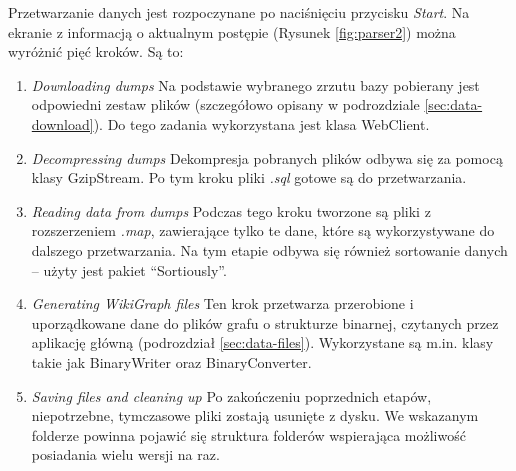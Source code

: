 Przetwarzanie danych jest rozpoczynane po naciśnięciu przycisku \textit{Start}. Na ekranie z informacją o aktualnym postępie (Rysunek \ref{fig:parser2}) można wyróżnić pięć kroków. Są to:

\begin{enumerate}[label=\textbullet]
    \item \textit{Downloading dumps} \linebreak
    Na podstawie wybranego zrzutu bazy pobierany jest odpowiedni zestaw plików (szczegółowo opisany w podrozdziale \ref{sec:data-download}). Do tego zadania wykorzystana jest klasa WebClient.
    \item \textit{Decompressing dumps} \linebreak
    Dekompresja pobranych plików odbywa się za pomocą klasy GzipStream. Po tym kroku pliki \textit{.sql} gotowe są do przetwarzania.
    \item \textit{Reading data from dumps} \linebreak
    Podczas tego kroku tworzone są pliki z rozszerzeniem \textit{.map}, zawierające tylko te dane, które są wykorzystywane do dalszego przetwarzania. Na tym etapie odbywa się również sortowanie danych – użyty jest pakiet ``Sortiously''\cite{Github:Sortiously}.
    \item \textit{Generating WikiGraph files} \linebreak
    Ten krok przetwarza przerobione i uporządkowane dane do plików grafu o strukturze binarnej, czytanych przez aplikację główną (podrozdział \ref{sec:data-files}). Wykorzystane są m.in. klasy takie jak BinaryWriter oraz BinaryConverter.
    \item \textit{Saving files and cleaning up} \linebreak	
    Po zakończeniu poprzednich etapów, niepotrzebne, tymczasowe pliki zostają usunięte z dysku. We wskazanym folderze powinna pojawić się struktura folderów wspierająca możliwość posiadania wielu wersji na raz.
\end{enumerate}